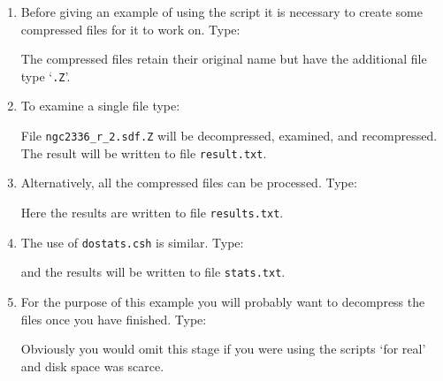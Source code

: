 \documentclass[twoside,11pt]{starlink}
\begin{document}
\begin{enumerate}

  \item Before giving an example of using the script it is necessary
   to create some compressed files for it to work on.  Type:

\begin{terminalv}
\end{terminalv}

   The compressed files retain their original name but have the additional
   file type `\texttt{.Z}'.

  \item To examine a single file type:

\begin{terminalv}
\end{terminalv}

   File \texttt{ngc2336\_r\_2.sdf.Z} will be decompressed, examined, and
   recompressed.  The result will be written to file \texttt{result.txt}.

  \item Alternatively, all the compressed files can be processed.  Type:

\begin{terminalv}
\end{terminalv}

   Here the results are written to file \texttt{results.txt}.

  \item The use of \texttt{dostats.csh} is similar.  Type:

\begin{terminalv}
\end{terminalv}

   and the results will be written to file \texttt{stats.txt}.

  \item For the purpose of this example you will probably want to
   decompress the files once you have finished.  Type:

\begin{terminalv}
\end{terminalv}

   Obviously you would omit this stage if you were using the scripts
   `for real' and disk space was scarce.

\end{enumerate}
\end{document}
